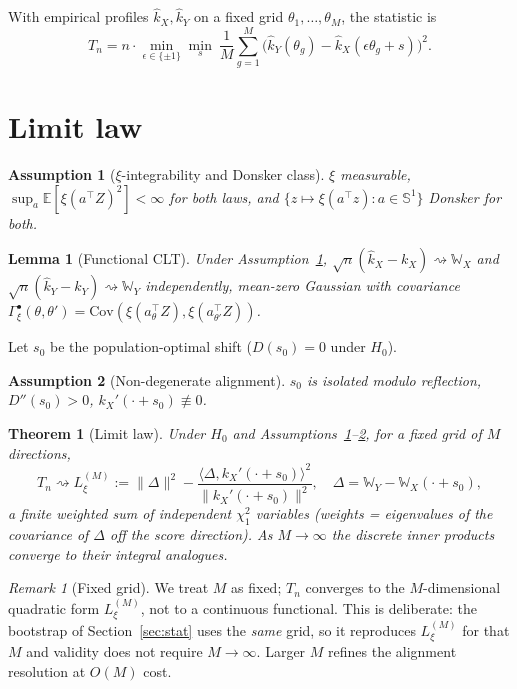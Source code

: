 \documentclass[]{interact}
\theoremstyle{plain}
\newtheorem{theorem}{Theorem}
\newtheorem{lemma}{Lemma}
\newtheorem{assumption}{Assumption}
\theoremstyle{remark}
\newtheorem{remark}{Remark}
\newcommand{\E}{\mathbb{E}}
\newcommand{\Sp}{\mathbb{S}}
\newcommand{\weakto}{\rightsquigarrow}
\newcommand{\Gp}{\mathbb{W}}
\begin{document}
With empirical profiles $\hat k_X,\hat k_Y$ on a fixed grid
$\theta_1,\dots,\theta_M$, the statistic is
\begin{equation}
\label{eq:Tn}
T_n=n\cdot\min_{\epsilon\in\{\pm1\}}\min_{s}\ \frac1M\sum_{g=1}^M
\big(\hat k_Y(\theta_g)-\hat k_X(\epsilon\theta_g+s)\big)^2 .
\end{equation}

\section{Limit law}
\label{sec:prob}

\begin{assumption}[$\xi$-integrability and Donsker class]
\label{ass:xi}
$\xi$ measurable, $\sup_a\E[\xi(a^\top Z)^2]<\infty$ for both laws, and
$\{z\mapsto\xi(a^\top z):a\in\Sp^1\}$ Donsker for both.
\end{assumption}

\begin{lemma}[Functional CLT]
\label{lem:clt}
Under Assumption~\ref{ass:xi}, $\sqrt n(\hat k_X-k_X)\weakto\Gp_X$ and
$\sqrt n(\hat k_Y-k_Y)\weakto\Gp_Y$ independently, mean-zero Gaussian with
covariance $\Gamma_\xi^\bullet(\theta,\theta')=\mathrm{Cov}(\xi(a_\theta^\top Z),
\xi(a_{\theta'}^\top Z))$.
\end{lemma}

Let $s_0$ be the population-optimal shift ($D(s_0)=0$ under $H_0$).

\begin{assumption}[Non-degenerate alignment]
\label{ass:nondeg}
$s_0$ is isolated modulo reflection, $D''(s_0)>0$, $k_X'(\cdot+s_0)\not\equiv0$.
\end{assumption}

\begin{theorem}[Limit law]
\label{thm:limit}
Under $H_0$ and Assumptions~\ref{ass:xi}--\ref{ass:nondeg}, for a fixed grid of $M$
directions,
\[
T_n\weakto L_\xi^{(M)}:=\|\Delta\|^2-\frac{\langle\Delta,k_X'(\cdot+s_0)\rangle^2}
{\|k_X'(\cdot+s_0)\|^2},\quad \Delta=\Gp_Y-\Gp_X(\cdot+s_0),
\]
a finite weighted sum of independent $\chi^2_1$ variables (weights = eigenvalues of
the covariance of $\Delta$ off the score direction). As $M\to\infty$ the discrete
inner products converge to their integral analogues.
\end{theorem}

\begin{remark}[Fixed grid]
\label{rem:grid}
We treat $M$ as fixed; $T_n$ converges to the $M$-dimensional quadratic form
$L_\xi^{(M)}$, not to a continuous functional. This is deliberate: the bootstrap of
Section~\ref{sec:stat} uses the \emph{same} grid, so it reproduces $L_\xi^{(M)}$
for that $M$ and validity does not require $M\to\infty$. Larger $M$ refines the
alignment resolution at $O(M)$ cost.
\end{remark}
\end{document}
